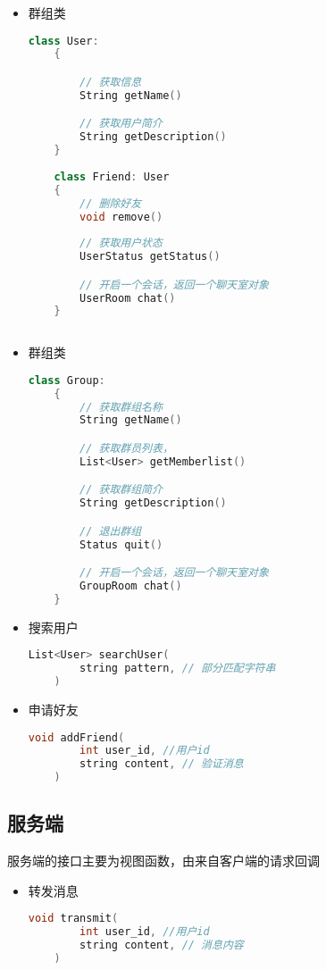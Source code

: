 {\begin{itemize}
    \item 群组类
    \begin{lstlisting}[language=c++]
    class User:
    {

        // 获取信息 
        String getName()

        // 获取用户简介
        String getDescription()
    }
    
    class Friend: User
    {
        // 删除好友
        void remove()
        
        // 获取用户状态
        UserStatus getStatus()

        // 开启一个会话，返回一个聊天室对象
        UserRoom chat()
    }
    
    \end{lstlisting}

    \item 群组类
    \begin{lstlisting}[language=c++]
    class Group:
    {
        // 获取群组名称
        String getName()

        // 获取群员列表，
        List<User> getMemberlist()

        // 获取群组简介
        String getDescription()

        // 退出群组 
        Status quit()

        // 开启一个会话，返回一个聊天室对象
        GroupRoom chat()
    }
    \end{lstlisting}

    \item 搜索用户
    \begin{lstlisting}[language=c++]
    List<User> searchUser(
        string pattern, // 部分匹配字符串
    )
    \end{lstlisting}

    \item 申请好友
    \begin{lstlisting}[language=c++]
    void addFriend(
        int user_id, //用户id
        string content, // 验证消息
    )
    \end{lstlisting}
\end{itemize}

\subsection{服务端}
服务端的接口主要为视图函数，由来自客户端的请求回调
\begin{itemize}
    \item 转发消息
    \begin{lstlisting}[language=c++]
    void transmit(
        int user_id, //用户id
        string content, // 消息内容
    )
    \end{lstlisting}

\end{itemize}
}